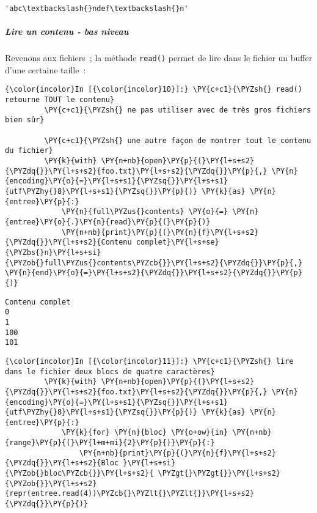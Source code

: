     \begin{Verbatim}[commandchars=\\\{\},frame=single,framerule=0.3mm,rulecolor=\color{cellframecolor}]
'abc\textbackslash{}ndef\textbackslash{}n'
\end{Verbatim}

    \hypertarget{lire-un-contenu---bas-niveau}{%
\subparagraph{Lire un contenu - bas
niveau}\label{lire-un-contenu---bas-niveau}}

    Revenons aux fichiers~; la méthode \texttt{read()} permet de lire dans
le fichier un buffer d'une certaine taille~:

    \begin{Verbatim}[commandchars=\\\{\},frame=single,framerule=0.3mm,rulecolor=\color{cellframecolor}]
{\color{incolor}In [{\color{incolor}10}]:} \PY{c+c1}{\PYZsh{} read() retourne TOUT le contenu}
         \PY{c+c1}{\PYZsh{} ne pas utiliser avec de très gros fichiers bien sûr}
         
         \PY{c+c1}{\PYZsh{} une autre façon de montrer tout le contenu du fichier}
         \PY{k}{with} \PY{n+nb}{open}\PY{p}{(}\PY{l+s+s2}{\PYZdq{}}\PY{l+s+s2}{foo.txt}\PY{l+s+s2}{\PYZdq{}}\PY{p}{,} \PY{n}{encoding}\PY{o}{=}\PY{l+s+s1}{\PYZsq{}}\PY{l+s+s1}{utf\PYZhy{}8}\PY{l+s+s1}{\PYZsq{}}\PY{p}{)} \PY{k}{as} \PY{n}{entree}\PY{p}{:}
             \PY{n}{full\PYZus{}contents} \PY{o}{=} \PY{n}{entree}\PY{o}{.}\PY{n}{read}\PY{p}{(}\PY{p}{)}
             \PY{n+nb}{print}\PY{p}{(}\PY{n}{f}\PY{l+s+s2}{\PYZdq{}}\PY{l+s+s2}{Contenu complet}\PY{l+s+se}{\PYZbs{}n}\PY{l+s+si}{\PYZob{}full\PYZus{}contents\PYZcb{}}\PY{l+s+s2}{\PYZdq{}}\PY{p}{,} \PY{n}{end}\PY{o}{=}\PY{l+s+s2}{\PYZdq{}}\PY{l+s+s2}{\PYZdq{}}\PY{p}{)}
\end{Verbatim}


    \begin{Verbatim}[commandchars=\\\{\},frame=single,framerule=0.3mm,rulecolor=\color{cellframecolor}]
Contenu complet
0
1
100
101
\end{Verbatim}

    \begin{Verbatim}[commandchars=\\\{\},frame=single,framerule=0.3mm,rulecolor=\color{cellframecolor}]
{\color{incolor}In [{\color{incolor}11}]:} \PY{c+c1}{\PYZsh{} lire dans le fichier deux blocs de quatre caractères}
         \PY{k}{with} \PY{n+nb}{open}\PY{p}{(}\PY{l+s+s2}{\PYZdq{}}\PY{l+s+s2}{foo.txt}\PY{l+s+s2}{\PYZdq{}}\PY{p}{,} \PY{n}{encoding}\PY{o}{=}\PY{l+s+s1}{\PYZsq{}}\PY{l+s+s1}{utf\PYZhy{}8}\PY{l+s+s1}{\PYZsq{}}\PY{p}{)} \PY{k}{as} \PY{n}{entree}\PY{p}{:}
             \PY{k}{for} \PY{n}{bloc} \PY{o+ow}{in} \PY{n+nb}{range}\PY{p}{(}\PY{l+m+mi}{2}\PY{p}{)}\PY{p}{:}
                 \PY{n+nb}{print}\PY{p}{(}\PY{n}{f}\PY{l+s+s2}{\PYZdq{}}\PY{l+s+s2}{Bloc }\PY{l+s+si}{\PYZob{}bloc\PYZcb{}}\PY{l+s+s2}{ \PYZgt{}\PYZgt{}}\PY{l+s+s2}{\PYZob{}}\PY{l+s+s2}{repr(entree.read(4))\PYZcb{}\PYZlt{}\PYZlt{}}\PY{l+s+s2}{\PYZdq{}}\PY{p}{)}
\end{Verbatim}


